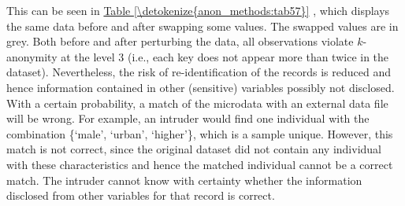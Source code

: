 \documentclass[letterpaper,10pt,english]{sphinxmanual}
\begin{document}
 This can be seen in \hyperref[\detokenize{anon_methods:tab57}]{Table \ref{\detokenize{anon_methods:tab57}}}
, which displays the same data before and after swapping some values.
The swapped values are in grey. Both before and after perturbing the
data, all observations violate \(k\)-anonymity at the level 3 (i.e.,
each key does not appear more than twice in the dataset). Nevertheless,
the risk of  re-identification of the records is reduced and
hence information contained in other (sensitive) variables possibly not
disclosed. With a certain probability, a match of the microdata with an
external data file will be wrong. For example, an intruder would find
one individual with the combination \{‘male’, ‘urban’, ‘higher’\}, which
is a sample unique. However, this match is not correct, since the
original dataset did not contain any individual with these
characteristics and hence the matched individual cannot be a correct
match. The intruder cannot know with certainty whether the information
disclosed from other variables for that record is correct.
\end{document}
